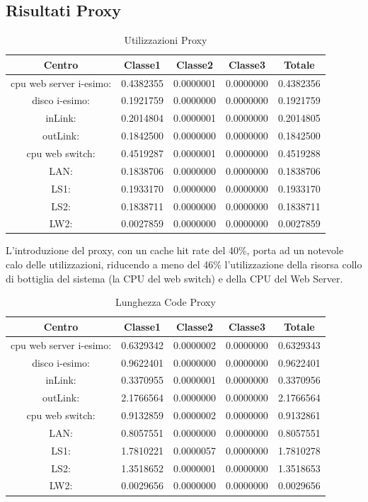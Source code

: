 \subsection{Risultati Proxy}
\begin{table}[H]
\begin{center}
\begin{tabular}{||c|c|c|c|c||}
\hline
Centro &Classe1 &Classe2 &Classe3 &Totale\\
\hline
\hline
 cpu web server i-esimo: 	&0.4382355	&0.0000001	&0.0000000	&0.4382356\\
\hline
 disco i-esimo: 	&0.1921759	&0.0000000	&0.0000000	&0.1921759\\
\hline
 inLink: 	&0.2014804	&0.0000001	&0.0000000	&0.2014805\\
\hline
 outLink: 	&0.1842500	&0.0000000	&0.0000000	&0.1842500\\
\hline
 cpu web switch: 	&0.4519287	&0.0000001	&0.0000000	&0.4519288\\
\hline
 LAN: 	&0.1838706	&0.0000000	&0.0000000	&0.1838706\\
\hline
 LS1: 	&0.1933170	&0.0000000	&0.0000000	&0.1933170\\
\hline
 LS2:	&0.1838711	&0.0000000	&0.0000000	&0.1838711\\
\hline
 LW2: 	&0.0027859	&0.0000000	&0.0000000	&0.0027859\\
\hline
\end{tabular}
\end{center}
\caption{Utilizzazioni Proxy}
\label{utilizzazioni}
\end{table}
L'introduzione del proxy, con un cache hit rate del 40\%, porta ad un notevole calo delle utilizzazioni, riducendo a meno del 46\% l'utilizzazione della risorsa collo di bottiglia del sistema (la CPU del web switch) e della CPU del Web Server. 
\begin{table}[H]
\begin{center}
\begin{tabular}{||c|c|c|c|c||}
\hline
Centro &Classe1 &Classe2 &Classe3 &Totale\\
\hline
\hline
 cpu web server i-esimo: 	&0.6329342	&0.0000002	&0.0000000	&0.6329343\\
\hline
 disco i-esimo: 	&0.9622401	&0.0000000	&0.0000000	&0.9622401\\
\hline
 inLink: 	&0.3370955	&0.0000001	&0.0000000	&0.3370956\\
\hline
 outLink: 	&2.1766564	&0.0000000	&0.0000000	&2.1766564\\
\hline
 cpu web switch: 	&0.9132859	&0.0000002	&0.0000000	&0.9132861\\
\hline
 LAN: 	&0.8057551	&0.0000000	&0.0000000	&0.8057551\\
\hline
 LS1: 	&1.7810221	&0.0000057	&0.0000000	&1.7810278\\
\hline
 LS2: 	&1.3518652	&0.0000001	&0.0000000	&1.3518653\\
\hline
 LW2: 	&0.0029656	&0.0000000	&0.0000000	&0.0029656\\
\hline
\end{tabular}
\end{center}
\caption{Lunghezza Code Proxy}
\label{lunghezzacode}
\end{table}
